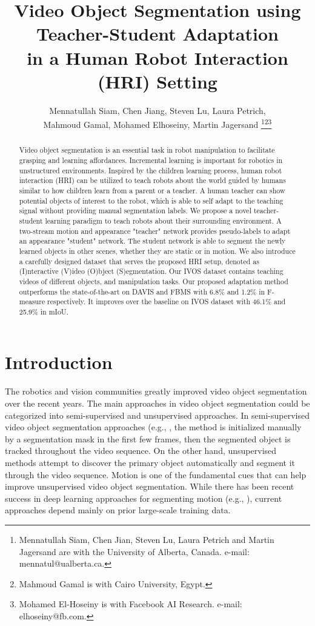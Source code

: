 \documentclass[letterpaper, 10 pt, conference]{ieeeconf}
\title{\LARGE \bf
Video Object Segmentation using Teacher-Student Adaptation \\ in a Human Robot Interaction (HRI) Setting
}
\author{ Mennatullah Siam, Chen Jiang, Steven Lu, Laura Petrich, \\ Mahmoud Gamal, 
Mohamed Elhoseiny, Martin Jagersand 
\thanks{Mennatullah Siam, Chen Jian, Steven Lu, Laura Petrich and Martin Jagersand are with the University of Alberta, Canada. 
e-mail: mennatul@ualberta.ca.}\thanks{Mahmoud Gamal is with Cairo University, Egypt.}\thanks{ Mohamed El-Hoseiny is with Facebook AI Research.
e-mail: elhoseiny@fb.com.}}
\begin{document}
\maketitle
\thispagestyle{empty}
\pagestyle{empty}


\begin{abstract}
Video object segmentation is an essential task in robot manipulation to facilitate grasping and learning affordances. Incremental learning is important for robotics in unstructured environments. Inspired by the children learning process, human robot interaction (HRI) can be utilized to teach robots about the world guided by humans similar to how children learn from a parent or a teacher. A human teacher can show potential objects of interest to the robot, which is able to self adapt to the teaching signal without providing manual segmentation labels. We propose a novel teacher-student learning paradigm to teach robots about their surrounding environment. A two-stream motion and appearance "teacher" network provides pseudo-labels to adapt an appearance "student" network. The student network is able to segment the newly learned objects in other scenes, whether they are static or in motion. We also introduce a carefully designed dataset that serves the proposed HRI setup, denoted as (I)nteractive (V)ideo (O)bject (S)egmentation. Our IVOS dataset contains teaching videos of different objects, and manipulation tasks. Our proposed adaptation method outperforms the state-of-the-art on DAVIS and FBMS with 6.8\% and 1.2\% in F-measure respectively. It improves over the baseline on IVOS dataset with 46.1\% and 25.9\% in mIoU. \end{abstract}

\section{Introduction}
The robotics and vision communities greatly improved video object segmentation over the recent years. The main approaches in video object segmentation could be categorized into semi-supervised and unsupervised approaches. In semi-supervised video object segmentation approaches (e.g., \cite{voigtlaender2017online}\cite{caelles2016one}\cite{khoreva2016learning}, the method is initialized manually by a segmentation mask in the first few frames, then the segmented object is tracked throughout the video sequence. On the other hand, unsupervised methods \cite{kohprimary}\cite{tokmakov2017learning}\cite{jain2017fusionseg}\cite{tokmakov2016learning} attempt to discover the primary object automatically and segment it through the video sequence. Motion is one of the fundamental cues that can help improve unsupervised video object segmentation. While there has been recent success in deep learning approaches for segmenting motion (e.g., \cite{tokmakov2017learning}\cite{jain2017fusionseg}\cite{tokmakov2016learning}), current approaches depend mainly on prior large-scale training data.
\end{document}
